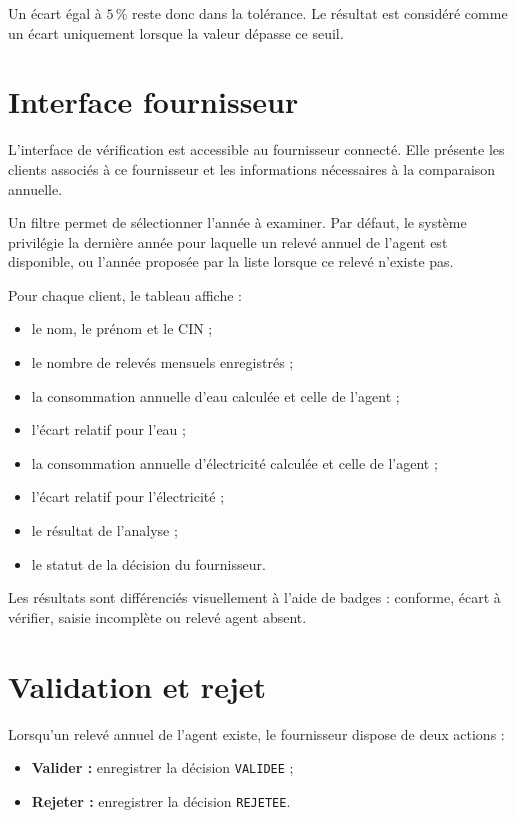 Un écart égal à \(5\,\%\) reste donc dans la tolérance. Le résultat est considéré comme un écart uniquement lorsque la valeur dépasse ce seuil.

\section{Interface fournisseur}

L'interface de vérification est accessible au fournisseur connecté. Elle présente les clients associés à ce fournisseur et les informations nécessaires à la comparaison annuelle.

Un filtre permet de sélectionner l'année à examiner. Par défaut, le système privilégie la dernière année pour laquelle un relevé annuel de l'agent est disponible, ou l'année proposée par la liste lorsque ce relevé n'existe pas.

Pour chaque client, le tableau affiche :
\begin{itemize}
    \item le nom, le prénom et le CIN ;
    \item le nombre de relevés mensuels enregistrés ;
    \item la consommation annuelle d'eau calculée et celle de l'agent ;
    \item l'écart relatif pour l'eau ;
    \item la consommation annuelle d'électricité calculée et celle de l'agent ;
    \item l'écart relatif pour l'électricité ;
    \item le résultat de l'analyse ;
    \item le statut de la décision du fournisseur.
\end{itemize}

Les résultats sont différenciés visuellement à l'aide de badges : conforme, écart à vérifier, saisie incomplète ou relevé agent absent.

\section{Validation et rejet}

Lorsqu'un relevé annuel de l'agent existe, le fournisseur dispose de deux actions :
\begin{itemize}
    \item \textbf{Valider :} enregistrer la décision \texttt{VALIDEE} ;
    \item \textbf{Rejeter :} enregistrer la décision \texttt{REJETEE}.
\end{itemize}

